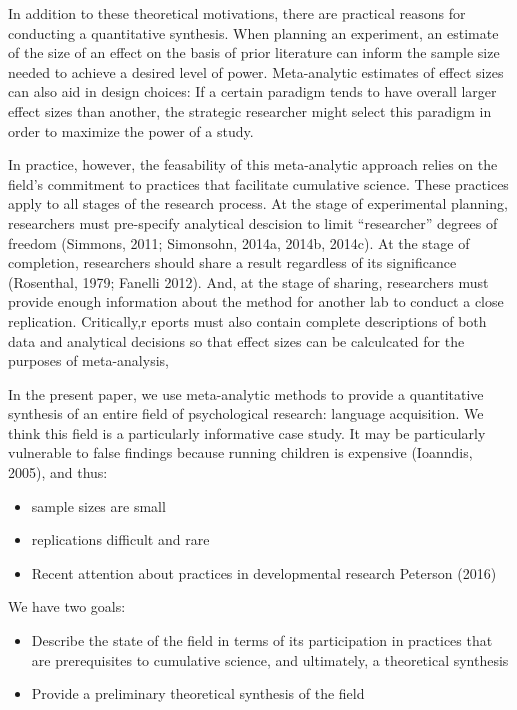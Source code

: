 \documentclass[american,floatsintext,man]{apa6}
\begin{document}
In addition to these theoretical motivations, there are practical
reasons for conducting a quantitative synthesis. When planning an
experiment, an estimate of the size of an effect on the basis of prior
literature can inform the sample size needed to achieve a desired level
of power. Meta-analytic estimates of effect sizes can also aid in design
choices: If a certain paradigm tends to have overall larger effect sizes
than another, the strategic researcher might select this paradigm in
order to maximize the power of a study.

In practice, however, the feasability of this meta-analytic approach
relies on the field's commitment to practices that facilitate cumulative
science. These practices apply to all stages of the research process. At
the stage of experimental planning, researchers must pre-specify
analytical descision to limit ``researcher'' degrees of freedom
(Simmons, 2011; Simonsohn, 2014a, 2014b, 2014c). At the stage of
completion, researchers should share a result regardless of its
significance (Rosenthal, 1979; Fanelli 2012). And, at the stage of
sharing, researchers must provide enough information about the method
for another lab to conduct a close replication. Critically,r eports must
also contain complete descriptions of both data and analytical decisions
so that effect sizes can be calculcated for the purposes of
meta-analysis,

In the present paper, we use meta-analytic methods to provide a
quantitative synthesis of an entire field of psychological research:
language acquisition. We think this field is a particularly informative
case study. It may be particularly vulnerable to false findings because
running children is expensive (Ioanndis, 2005), and thus:

\begin{itemize}
\itemsep1pt\parskip0pt
\item
  sample sizes are small
\item
  replications difficult and rare
\item
  Recent attention about practices in developmental research Peterson
  (2016)
\end{itemize}

We have two goals:

\begin{itemize}
\itemsep1pt\parskip0pt
\item
  Describe the state of the field in terms of its participation in
  practices that are prerequisites to cumulative science, and
  ultimately, a theoretical synthesis
\item
  Provide a preliminary theoretical synthesis of the field
\end{itemize}
\end{document}

